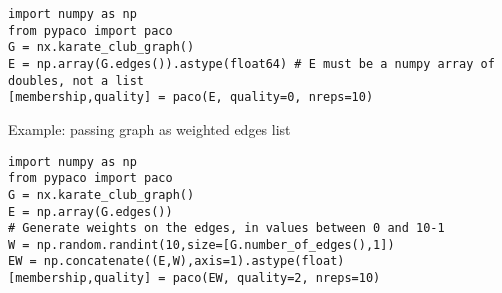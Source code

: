 \documentclass[11pt,%
              a4paper,%
]{article}
\begin{document}
\begin{verbatim}
import numpy as np
from pypaco import paco
G = nx.karate_club_graph()
E = np.array(G.edges()).astype(float64) # E must be a numpy array of doubles, not a list
[membership,quality] = paco(E, quality=0, nreps=10)
\end{verbatim}

Example: passing graph as weighted edges list

\begin{verbatim}    
import numpy as np
from pypaco import paco
G = nx.karate_club_graph()
E = np.array(G.edges())
# Generate weights on the edges, in values between 0 and 10-1
W = np.random.randint(10,size=[G.number_of_edges(),1])
EW = np.concatenate((E,W),axis=1).astype(float)
[membership,quality] = paco(EW, quality=2, nreps=10)
\end{verbatim}
\end{document}
